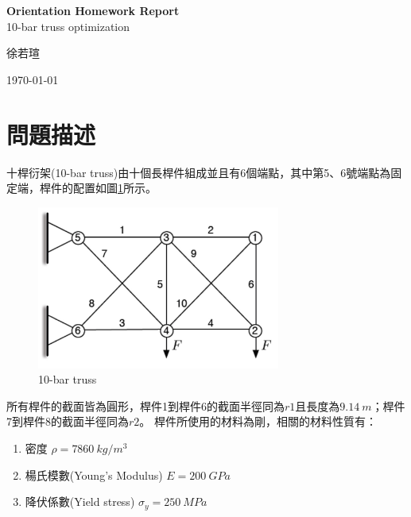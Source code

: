 \documentclass[12pt,a4paper]{article}
\begin{document}
\begin{center}
    
    \vspace*{5cm}
    \textbf{\huge Orientation Homework Report}\\   %
    
    \vspace{1cm}
    {\large 10-bar truss optimization}
    
    \vfill
    {\Large 徐若瑄}
    
    \vspace{1cm}
    {\Large \today}

\end{center}
\newpage




\section{問題描述}

    十桿衍架(10-bar truss)由十個長桿件組成並且有6個端點，其中第5、6號端點為固定端，桿件的配置如圖\ref{10-bar truss}所示。
    
    \begin{figure}[h]
        \centering
        \includegraphics[width=8cm]{10_bar_truss}
        \caption{10-bar truss}
        \label{10-bar truss}
    \end{figure}
    
    所有桿件的截面皆為圓形，桿件1到桿件6的截面半徑同為$r1$且長度為$9.14\  m$；桿件7到桿件8的截面半徑同為$r2$。
    桿件所使用的材料為剛，相關的材料性質有：
    
    \begin{enumerate}
        \item 密度 $\rho = 7860\ kg/m^3$
        \item 楊氏模數(Young's Modulus) $E = 200\ GPa$
        \item 降伏係數(Yield stress) $\sigma_y = 250\ MPa$
    \end{enumerate}
    
\end{document}

